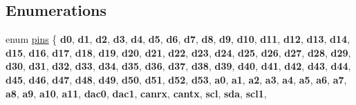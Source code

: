 \subsection*{Enumerations}
\begin{DoxyCompactItemize}
\item 
enum \hyperlink{namespacedue_a8ffa3ec309934ff9db34317e504bcc92}{pins} \{ \newline
{\bfseries d0}, 
{\bfseries d1}, 
{\bfseries d2}, 
{\bfseries d3}, 
\newline
{\bfseries d4}, 
{\bfseries d5}, 
{\bfseries d6}, 
{\bfseries d7}, 
\newline
{\bfseries d8}, 
{\bfseries d9}, 
{\bfseries d10}, 
{\bfseries d11}, 
\newline
{\bfseries d12}, 
{\bfseries d13}, 
{\bfseries d14}, 
{\bfseries d15}, 
\newline
{\bfseries d16}, 
{\bfseries d17}, 
{\bfseries d18}, 
{\bfseries d19}, 
\newline
{\bfseries d20}, 
{\bfseries d21}, 
{\bfseries d22}, 
{\bfseries d23}, 
\newline
{\bfseries d24}, 
{\bfseries d25}, 
{\bfseries d26}, 
{\bfseries d27}, 
\newline
{\bfseries d28}, 
{\bfseries d29}, 
{\bfseries d30}, 
{\bfseries d31}, 
\newline
{\bfseries d32}, 
{\bfseries d33}, 
{\bfseries d34}, 
{\bfseries d35}, 
\newline
{\bfseries d36}, 
{\bfseries d37}, 
{\bfseries d38}, 
{\bfseries d39}, 
\newline
{\bfseries d40}, 
{\bfseries d41}, 
{\bfseries d42}, 
{\bfseries d43}, 
\newline
{\bfseries d44}, 
{\bfseries d45}, 
{\bfseries d46}, 
{\bfseries d47}, 
\newline
{\bfseries d48}, 
{\bfseries d49}, 
{\bfseries d50}, 
{\bfseries d51}, 
\newline
{\bfseries d52}, 
{\bfseries d53}, 
{\bfseries a0}, 
{\bfseries a1}, 
\newline
{\bfseries a2}, 
{\bfseries a3}, 
{\bfseries a4}, 
{\bfseries a5}, 
\newline
{\bfseries a6}, 
{\bfseries a7}, 
{\bfseries a8}, 
{\bfseries a9}, 
\newline
{\bfseries a10}, 
{\bfseries a11}, 
{\bfseries dac0}, 
{\bfseries dac1}, 
\newline
{\bfseries canrx}, 
{\bfseries cantx}, 
{\bfseries scl}, 
{\bfseries sda}, 
\newline
{\bfseries scl1}, 

\end{DoxyCompactItemize}
